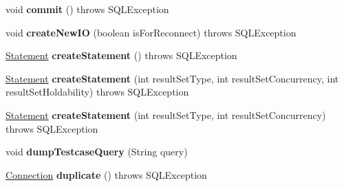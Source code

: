 \begin{DoxyCompactItemize}
void {\bfseries commit} ()  throws S\+Q\+L\+Exception 
\item 
\mbox{\label{classcom_1_1mysql_1_1jdbc_1_1_multi_host_my_s_q_l_connection_a0e6027606355eae1255453eac42312a3}} 
void {\bfseries create\+New\+IO} (boolean is\+For\+Reconnect)  throws S\+Q\+L\+Exception 
\item 
\mbox{\label{classcom_1_1mysql_1_1jdbc_1_1_multi_host_my_s_q_l_connection_a208845c57bd3a0ec888ca5322e609707}} 
\mbox{\hyperlink{interfacecom_1_1mysql_1_1jdbc_1_1_statement}{Statement}} {\bfseries create\+Statement} ()  throws S\+Q\+L\+Exception 
\item 
\mbox{\label{classcom_1_1mysql_1_1jdbc_1_1_multi_host_my_s_q_l_connection_a1d25a6f700e5b783e29fac15e7f2fe10}} 
\mbox{\hyperlink{interfacecom_1_1mysql_1_1jdbc_1_1_statement}{Statement}} {\bfseries create\+Statement} (int result\+Set\+Type, int result\+Set\+Concurrency, int result\+Set\+Holdability)  throws S\+Q\+L\+Exception 
\item 
\mbox{\label{classcom_1_1mysql_1_1jdbc_1_1_multi_host_my_s_q_l_connection_a964ccac1380047499195473f8012e607}} 
\mbox{\hyperlink{interfacecom_1_1mysql_1_1jdbc_1_1_statement}{Statement}} {\bfseries create\+Statement} (int result\+Set\+Type, int result\+Set\+Concurrency)  throws S\+Q\+L\+Exception 
\item 
\mbox{\label{classcom_1_1mysql_1_1jdbc_1_1_multi_host_my_s_q_l_connection_a1c6a264b0757ef6d6f5af8f28892b975}} 
void {\bfseries dump\+Testcase\+Query} (String query)
\item 
\mbox{\label{classcom_1_1mysql_1_1jdbc_1_1_multi_host_my_s_q_l_connection_a82690609d323ea234d2f3569d94271b5}} 
\mbox{\hyperlink{interfacecom_1_1mysql_1_1jdbc_1_1_connection}{Connection}} {\bfseries duplicate} ()  throws S\+Q\+L\+Exception 
\item 
\mbox{\label{classcom_1_1mysql_1_1jdbc_1_1_multi_host_my_s_q_l_connection_a17a3ad4664e46447f56d763230de1b65}} 

\end{DoxyCompactItemize}
